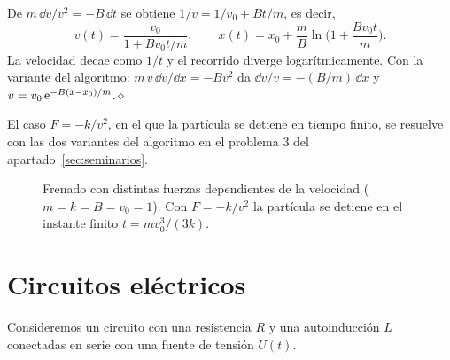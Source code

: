 \documentclass[11pt,twoside]{article}
\newcommand\fin{\hfill\textcolor{muted}{$\diamond$}}
\newcommand\leyenda[2]{\textcolor{#1}{\rule[2.2pt]{11pt}{1.1pt}}\ #2}
\begin{document}
\begin{ejemplo}[arrastre cuadrático, $F(v)=-Bv^2$]
De $m\,\dd v/v^2=-B\,\dd t$ se obtiene $1/v=1/v_0+Bt/m$, es decir,
\begin{equation*}
v(t)=\frac{v_0}{1+Bv_0t/m},\qquad x(t)=x_0+\frac mB\ln\Big(1+\frac{Bv_0t}{m}\Big).
\end{equation*}
La velocidad decae como $1/t$ y el recorrido diverge logarítmicamente. Con la variante del algoritmo:
$m\,v\,\dd v/\dd x=-Bv^2$ da $\dd v/v=-(B/m)\,\dd x$ y $v=v_0\,\mathrm{e}^{-B(x-x_0)/m}$.\fin
\end{ejemplo}

El caso $F=-k/v^2$, en el que la partícula se detiene en tiempo finito, se resuelve con las dos variantes del algoritmo en
el problema 3 del apartado~\ref{sec:seminarios}.

\begin{figure}[!htbp]
\centering
{}
\caption{Frenado con distintas fuerzas dependientes de la velocidad ($m=k=B=v_0=1$). Con $F=-k/v^2$ la partícula se detiene
en el instante finito $t=mv_0^3/(3k)$.}
\label{fig:frenado}
\end{figure}

\section{Circuitos eléctricos}\label{sec:circuitos}

Consideremos un circuito con una resistencia $R$ y una autoinducción $L$ conectadas en serie con una fuente de tensión $U(t)$.
\end{document}
